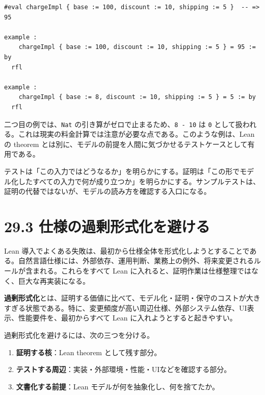\begin{listing}[htbp]
\begin{verbatim}
#eval chargeImpl { base := 100, discount := 10, shipping := 5 }  -- => 95

example :
    chargeImpl { base := 100, discount := 10, shipping := 5 } = 95 := by
  rfl

example :
    chargeImpl { base := 8, discount := 10, shipping := 5 } = 5 := by
  rfl
\end{verbatim}
\caption{代表例を確認するテスト的な使い方}
\label{lst:ch29-charge-examples}
\end{listing}

二つ目の例では、\texttt{Nat} の引き算がゼロで止まるため、\texttt{8 - 10} は \texttt{0} として扱われる。これは現実の料金計算では注意が必要な点である。このような例は、Lean の theorem とは別に、モデルの前提を人間に気づかせるテストケースとして有用である。

\begin{intuitionbox}
テストは「この入力ではどうなるか」を明らかにする。証明は「この形でモデル化したすべての入力で何が成り立つか」を明らかにする。サンプルテストは、証明の代替ではないが、モデルの読み方を確認する入口になる。
\end{intuitionbox}

\section{29.3 仕様の過剰形式化を避ける}

Lean 導入でよくある失敗は、最初から仕様全体を形式化しようとすることである。自然言語仕様には、外部依存、運用判断、業務上の例外、将来変更されるルールが含まれる。これらをすべて Lean に入れると、証明作業は仕様整理ではなく、巨大な再実装になる。

\begin{definitionbox}
\textbf{過剰形式化}とは、証明する価値に比べて、モデル化・証明・保守のコストが大きすぎる状態である。特に、変更頻度が高い周辺仕様、外部システム依存、UI表示、性能要件を、最初からすべて Lean に入れようとすると起きやすい。
\end{definitionbox}

過剰形式化を避けるには、次の三つを分ける。

\begin{enumerate}
\item \textbf{証明する核}：Lean theorem として残す部分。
\item \textbf{テストする周辺}：実装・外部環境・性能・UIなどを確認する部分。
\item \textbf{文書化する前提}：Lean モデルが何を抽象化し、何を捨てたか。
\end{enumerate}


